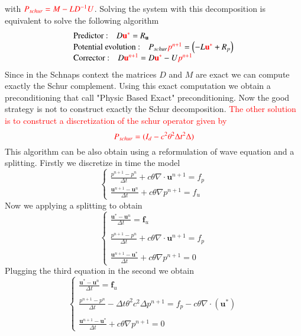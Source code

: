 \documentclass[a4paper,twoside,french,english,11pt]{article}
\newcommand{\ds}{\displaystyle}
\begin{document}
with $\textcolor{red}{P_{schur}=M-LD^{-1}U}$. Solving the system with this decomposition is equivalent to solve the following algorithm 
$$
\left.\begin{array}{l}
\mbox{Predictor :\quad} D \textcolor{red}{\mathbf{u}^*}=R_{\mathbf{u}}\\
\mbox{Potential evolution :\quad} P_{schur}\textcolor{red}{p^{n+1}}=\left(-L\textcolor{red}{\mathbf{u}^*}+R_{p}\right)\\
\mbox{Corrector :\quad}  D\textcolor{red}{\mathbf{u}^{n+1}}=D\textcolor{red}{\mathbf{u}^*}-U\textcolor{red}{p^{n+1}}\end{array}\right.
$$
Since in the Schnaps context the matrices $D$ and $M$ are exact we can compute exactly the Schur complement. Using this exact computation we obtain a preconditioning that call "Physic Based Exact" preconditioning.
Now the good strategy is not to construct exactly the Schur decomposition. \textcolor{red}{The other solution is to construct a discretization of the schur operator given by}
$$
\displaystyle \textcolor{red}{P_{schur}=(I_d-c^2\theta^2 \Delta t^2 \Delta )}
$$
This algorithm can be also obtain using a reformulation of wave equation and a splitting. Firstly we discretize in time the model
$$
\left\{\begin{array}{l}
\ds \frac{p^{n+1}-p^n}{\Delta t}+c\theta \nabla \cdot \bm{u}^{n+1}= f_p \\
\ds \frac{\bm{u}^{n+1}-\bm{u}^n}{\Delta t} +c\theta \nabla p^{n+1} = f_u \end{array}\right.
$$
Now we applying a splitting to obtain
$$
\left\{\begin{array}{l}
\ds \frac{\bm{u}^{*}-\bm{u}^n}{\Delta t}  = \mathbf{f}_u\\
~\\
\ds \frac{p^{n+1}-p^n}{\Delta t}+ c\theta \nabla \cdot  \mathbf{u}^{n+1}= f_p\\
~\\
\ds \frac{\bm{u}^{n+1}-\bm{u}^*}{\Delta t} +c\theta \nabla p^{n+1} = 0 \end{array}\right.
$$
Plugging the third equation in the second we obtain
$$
\left\{\begin{array}{l}
\ds \frac{\bm{u}^{*}-\bm{u}^n}{\Delta t}  = \mathbf{f}_u\\
~\\
\ds \frac{p^{n+1}-p^n}{\Delta t}- \Delta t \theta^2 c^2\Delta p^{n+1} = f_p-c\theta \nabla \cdot (\bm{u}^*) \\
~\\
\ds \frac{\bm{u}^{n+1}-\bm{u}^*}{\Delta t} +c\theta \nabla p^{n+1} = 0 \end{array}\right.
$$
\end{document}

